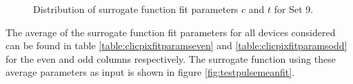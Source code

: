 \begin{figure}
\centering
{}
\label{fig:fitparams2d}
\caption[Distribution as a function of matrix position of surrogate function fit parameter $c$ for Set 9.]{Distribution of surrogate function fit parameters $c$ and $t$ for Set 9.}
\end{figure}

The average of the surrogate function fit parameters for all devices considered can be found in table \ref{table:clicpixfitparamseven} and  \ref{table:clicpixfitparamsodd} for the even and odd columns respectively.  The surrogate function using these average parameters as input is shown in figure \ref{fig:testpulsemeanfit}.


